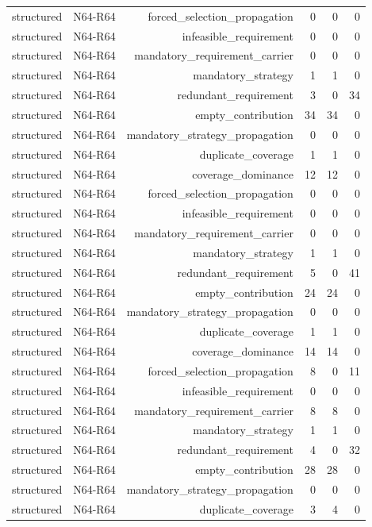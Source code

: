 {\begin{longtable}{lrrrrr}
structured & N64-R64 & forced\_selection\_propagation & 0 & 0 & 0 \\
structured & N64-R64 & infeasible\_requirement & 0 & 0 & 0 \\
structured & N64-R64 & mandatory\_requirement\_carrier & 0 & 0 & 0 \\
structured & N64-R64 & mandatory\_strategy & 1 & 1 & 0 \\
structured & N64-R64 & redundant\_requirement & 3 & 0 & 34 \\
structured & N64-R64 & empty\_contribution & 34 & 34 & 0 \\
structured & N64-R64 & mandatory\_strategy\_propagation & 0 & 0 & 0 \\
structured & N64-R64 & duplicate\_coverage & 1 & 1 & 0 \\
structured & N64-R64 & coverage\_dominance & 12 & 12 & 0 \\
structured & N64-R64 & forced\_selection\_propagation & 0 & 0 & 0 \\
structured & N64-R64 & infeasible\_requirement & 0 & 0 & 0 \\
structured & N64-R64 & mandatory\_requirement\_carrier & 0 & 0 & 0 \\
structured & N64-R64 & mandatory\_strategy & 1 & 1 & 0 \\
structured & N64-R64 & redundant\_requirement & 5 & 0 & 41 \\
structured & N64-R64 & empty\_contribution & 24 & 24 & 0 \\
structured & N64-R64 & mandatory\_strategy\_propagation & 0 & 0 & 0 \\
structured & N64-R64 & duplicate\_coverage & 1 & 1 & 0 \\
structured & N64-R64 & coverage\_dominance & 14 & 14 & 0 \\
structured & N64-R64 & forced\_selection\_propagation & 8 & 0 & 11 \\
structured & N64-R64 & infeasible\_requirement & 0 & 0 & 0 \\
structured & N64-R64 & mandatory\_requirement\_carrier & 8 & 8 & 0 \\
structured & N64-R64 & mandatory\_strategy & 1 & 1 & 0 \\
structured & N64-R64 & redundant\_requirement & 4 & 0 & 32 \\
structured & N64-R64 & empty\_contribution & 28 & 28 & 0 \\
structured & N64-R64 & mandatory\_strategy\_propagation & 0 & 0 & 0 \\
structured & N64-R64 & duplicate\_coverage & 3 & 4 & 0 \\

\end{longtable}}
